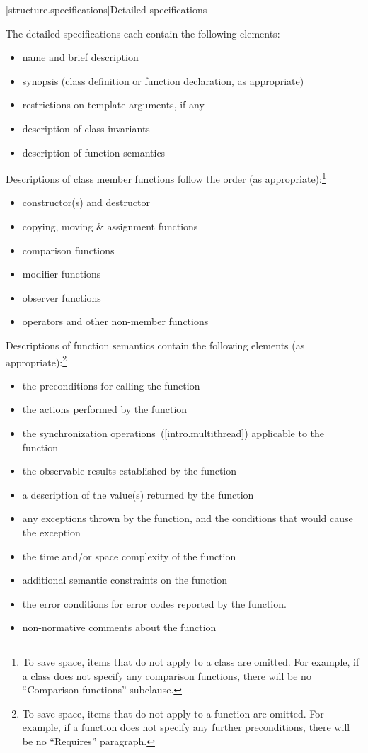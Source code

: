 [structure.specifications]{Detailed specifications}

\pnum
The detailed specifications each contain the following elements:%

\begin{itemize}
\item name and brief description
\item synopsis (class definition or function declaration, as appropriate)
\item restrictions on template arguments, if any
\item description of class invariants
\item description of function semantics
\end{itemize}

\pnum
Descriptions of class member functions follow the order (as
appropriate):\footnote{To save space, items that do not apply to a class are omitted.
For example, if a class does not specify any comparison functions, there
will be no ``Comparison functions'' subclause.}

\begin{itemize}
\item constructor(s) and destructor
\item copying, moving \& assignment functions
\item comparison functions
\item modifier functions
\item observer functions
\item operators and other non-member functions
\end{itemize}

\pnum
Descriptions of function semantics contain the following elements (as
appropriate):\footnote{To save space, items that do not apply to a function are omitted.
For example, if a function does not specify any
further
preconditions, there will be no ``Requires'' paragraph.}

\begin{itemize}
\item \requires the preconditions for calling the function
\item \effects the actions performed by the function
\item \sync the synchronization operations~(\ref{intro.multithread}) applicable to the function
\item \postconditions the observable results established by the function
\item \returns a description of the value(s) returned by the function
\item \throws any exceptions thrown by the function, and the conditions that would cause the exception
\item \complexity the time and/or space complexity of the function
\item \remarks additional semantic constraints on the function
\item \errors the error conditions for error codes reported by the function.
\item \realnotes non-normative comments about the function
\end{itemize}

